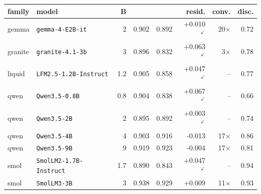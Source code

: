 \begin{tabular}{llrrrrrr}
\toprule
family & model & B & \armR{} & \armNm{} & resid. & conv. & disc. \\
\midrule
gemma & \texttt{gemma-4-E2B-it} & 2 & 0.902 & 0.892 & +0.010$^{\checkmark}$ & 20$\times$ & 0.72 \\
\addlinespace
granite & \texttt{granite-4.1-3b} & 3 & 0.896 & 0.832 & +0.063$^{\checkmark}$ & 3$\times$ & 0.78 \\
\addlinespace
liquid & \texttt{LFM2.5-1.2B-Instruct} & 1.2 & 0.905 & 0.858 & +0.047$^{\checkmark}$ & -- & 0.77 \\
\addlinespace
qwen & \texttt{Qwen3.5-0.8B} & 0.8 & 0.904 & 0.838 & +0.067$^{\checkmark}$ & -- & 0.66 \\
qwen & \texttt{Qwen3.5-2B} & 2 & 0.895 & 0.892 & +0.003$^{\checkmark}$ & -- & 0.74 \\
qwen & \texttt{Qwen3.5-4B} & 4 & 0.903 & 0.916 & -0.013 & 17$\times$ & 0.86 \\
qwen & \texttt{Qwen3.5-9B} & 9 & 0.919 & 0.923 & -0.004 & 17$\times$ & 0.81 \\
\addlinespace
smol & \texttt{SmolLM2-1.7B-Instruct} & 1.7 & 0.890 & 0.843 & +0.047$^{\checkmark}$ & -- & 0.94 \\
smol & \texttt{SmolLM3-3B} & 3 & 0.938 & 0.929 & +0.009 & 11$\times$ & 0.93 \\
\bottomrule
\end{tabular}
